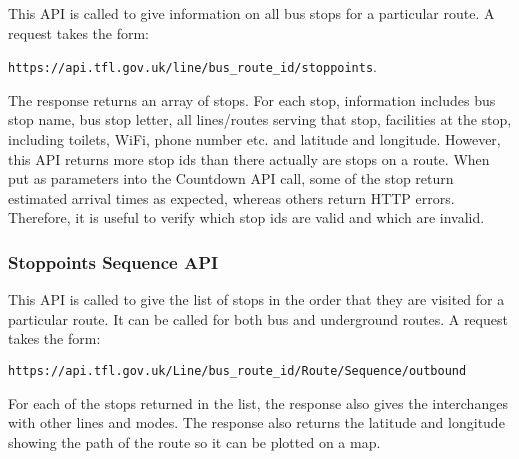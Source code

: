 This API is called to give information on all bus stops for a particular route. A request takes the form:

\begin{center}
\texttt{https://api.tfl.gov.uk/line/bus\_route\_id/stoppoints}.
\end{center}

The response returns an array of stops. For each stop, information includes bus stop name, bus stop letter, all lines/routes serving that stop, facilities at the stop, including toilets, WiFi, phone number etc. and latitude and longitude. However, this API returns more stop ids than there actually are stops on a route. When put as parameters into the Countdown API call, some of the stop return estimated arrival times as expected, whereas others return HTTP errors. Therefore, it is useful to verify which stop ids are valid and which are invalid. 

\subsubsection{Stoppoints Sequence API}

This API is called to give the list of stops in the order that they are visited for a particular route. It can be called for both bus and underground routes. A request takes the form: 

\begin{center}
    \texttt{https://api.tfl.gov.uk/Line/bus\_route\_id/Route/Sequence/outbound}
\end{center}

For each of the stops returned in the list, the response also gives the interchanges with other lines and modes. The response also returns the latitude and longitude showing the path of the route so it can be plotted on a map.

\clearpage
